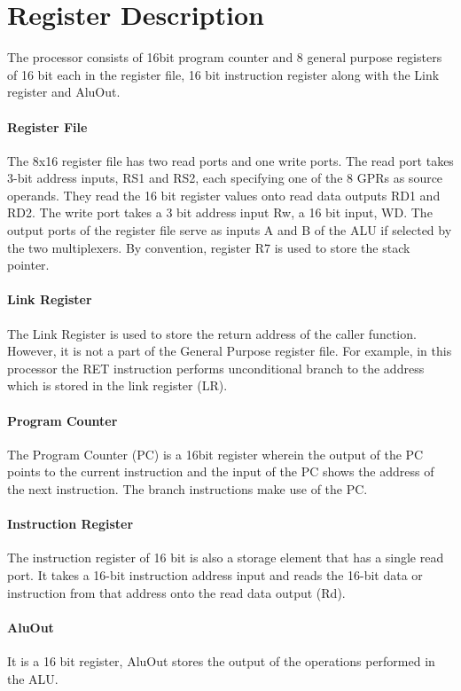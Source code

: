 
\section{Register Description}

The processor consists of 16bit program counter and 8 general purpose registers of 16 bit each in the register file, 16 bit instruction register along with the Link register and AluOut. 

\paragraph{Register File}
The 8x16 register file has two read ports and one write ports. 
The read port takes 3-bit address inputs, RS1 and RS2, each specifying one of the 8 GPRs as source operands. 
They read the 16 bit register values onto read data outputs RD1 and RD2. 
The write port takes a 3 bit address input Rw, a 16 bit input, WD. 
The output ports of the register file serve as inputs A and B of the ALU if selected by the two multiplexers. 
By convention, register R7 is used to store the stack pointer.

\paragraph{Link Register} 
The Link Register is used to store the return address of the caller function. 
However, it is not a part of the General Purpose register file. 
For example, in this processor the RET instruction performs unconditional branch to the address which is stored in the link register (LR).

\paragraph{Program Counter} 
The Program Counter (PC) is a 16bit register wherein the output of the PC points to the current instruction and the input of the PC shows the address of the next instruction. 
The branch instructions make use of the PC. 

\paragraph{Instruction Register} 
The instruction register of 16 bit is also a storage element that has a single read port. 
It takes a 16-bit instruction address input and reads the 16-bit data or instruction from that address onto the read data output (Rd). 

\paragraph{AluOut} 
It is a 16 bit register, AluOut stores the output of the operations performed in the ALU.

